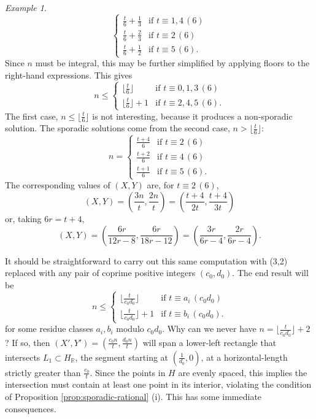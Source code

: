 \documentclass[12pt,letterpaper, reqno]{amsart}
\newtheorem{prop}[thm]{Proposition}
\theoremstyle{definition}
\theoremstyle{remark}
\newtheorem{exa}[thm]{Example}
\newcommand{\RR}{\ensuremath{\mathbb{R}}}
\newcommand{\floor}[1]{\lfloor{#1}\rfloor}
\begin{document}
\begin{exa}
\[\begin{cases}
\frac{t}{6} + \frac13 & \text{if } t \equiv 1,4 \,(6) \\
\frac{t}{6} + \frac23 & \text{if } t \equiv 2 \,(6)\\
\frac{t}{6} + \frac12 & \text{if } t \equiv 5 \,(6) .
\end{cases}\]
Since $n$ must be integral, this may be further simplified by applying floors to the right-hand expressions. This gives
\[ n \leq \begin{cases}
\floor{\frac{t}6} & \text{if }t\equiv 0,1,3 \,(6)\\
\floor{\frac{t}{6}} + 1 & \text{if } t \equiv 2,4,5 \,(6) .
\end{cases}\]
The first case, $n \leq \floor{\frac{t}{6}}$ is not interesting, because it produces a non-sporadic solution. The sporadic solutions come from the second case, $n > \floor{\frac{t}{6}}$:
\[ n =\begin{cases}
\frac{t+4}{6} & \text{if }t\equiv 2 \,(6)\\
\frac{t+2}{6} & \text{if }t\equiv 4 \,(6)\\
\frac{t+1}{6} & \text{if }t\equiv 5 \,(6).
\end{cases}\]
The corresponding values of $(X,Y)$ are, for $t \equiv 2\,(6)$,
\[ (X,Y) = (\frac{3n}{t},\frac{2n}{t}) =  (\frac{t+4}{2t}, \frac{t+4}{3t} )\]
or, taking $6r = t+4$,
\[ (X,Y) = (\frac{6r}{12r-8},\frac{6r}{18r-12}) = (\frac{3r}{6r-4},\frac{2r}{6r-4}).\]
\end{exa}
It should be straightforward to carry out this same computation with (3,2) replaced with any pair of coprime positive integers $(c_0,d_0)$. The end result will be
\[ n\leq  \begin{cases}
\floor{\frac{t}{c_0d_0}} & \text{if }t\equiv a_i \,(c_0d_0)\\
\floor{\frac{t}{c_0d_0}} + 1 & \text{if } t \equiv b_i \,(c_0d_0) .
\end{cases}\]
for some residue classes $a_i,b_i$ modulo $c_0d_0$.
Why can we never have $n = \floor{\frac{t}{c_0d_0}} + 2$? If so, then $(X',Y') = (\frac{c_0 n}{t},\frac{d_0 n}{t})$ will span a lower-left rectangle that intersects $L_1 \subset H_\RR$, the segment starting at $(\frac1{d_0},0)$, at a horizontal-length strictly greater than $\frac {c_0}{t}$. 
Since the points in $H$ are evenly spaced, this implies the intersection must contain at least one point in its interior, violating the condition of Proposition \ref{prop:sporadic-rational} (i). This has some immediate consequences.

\end{document}
